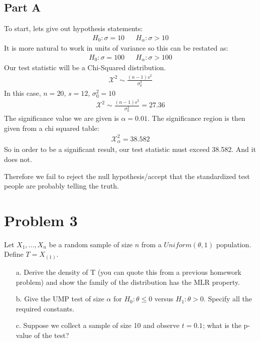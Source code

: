 \documentclass{article}
\begin{document}
\subsection*{Part A}
To start, lets give out hypothesis statements:
\begin{align*}
H_0: \sigma = 10 && H_\alpha: \sigma > 10
\end{align*}
It is more natural to work in units of variance so this can be restated as:
\begin{align*}
H_0: \sigma = 100 && H_\alpha: \sigma > 100
\end{align*}
Our test statistic will be a Chi-Squared distribution.
\begin{align*}
\mathcal{X}^2 \sim \frac{(n-1)s^2}{\sigma^2_0}
\end{align*}
In this case, $n=20$, $s=12$, $\sigma^2_0=10$
\begin{align*}
\mathcal{X}^2 \sim \frac{(n-1)s^2}{\sigma^2_0} = 27.36
\end{align*}
The significance value we are given is $\alpha=0.01$. The significance region is then given from a chi squared table:
\begin{align*}
\mathcal{X}^2_{\alpha} = 38.582
\end{align*}
So in order to be a significant result, our test statistic must exceed 38.582. And it does not.

Therefore we fail to reject the null hypothesis/accept that the standardized test people are probably telling the truth.
\clearpage

\section*{Problem 3}
Let $X_1,...,X_n$ be a random sample of size $n$ from a $Uniform(\theta,1)$ population. Define $T=X_{(1)}$.
\begin{enumerate}
\item[a.] Derive the density of T (you can quote this from a previous homework problem) and show the family of the distribution has the MLR property.
\item[b.] Give the UMP test of size $\alpha$ for $H_0 : \theta \leq 0$ versus $H_1 : \theta > 0$. Specify all the required
constants.
\item[c.] Suppose we collect a sample of size 10 and observe $t = 0.1$; what is the p-value of the test?
\end{enumerate}
\end{document}

